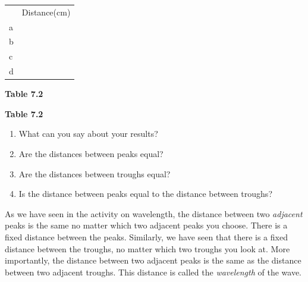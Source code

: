           \begin{table}[H]
        \begin{center}
      \label{m38806*id318530}
    \noindent
      \tablelasttail{}
      \begin{xtabular}[t]{|l|l|}\hline
         &
        Distance(cm)%
     \tabularnewline{}
        a &
     \tabularnewline{}
        b &
     \tabularnewline{}
        c &
     \tabularnewline{}
        d &
     \tabularnewline{}
    \end{xtabular}
      \end{center}
    \begin{center}{\small\bfseries Table 7.2}\end{center}
    \begin{caption}{\small\bfseries Table 7.2}\end{caption}
\end{table}
    \par
        \label{m38806*id318631}\begin{enumerate}[noitemsep, label=\textbf{\arabic*}. ] 
            \label{m38806*uid15}\item What can you say about your results?
\label{m38806*uid16}\item Are the distances between peaks equal?
\label{m38806*uid17}\item Are the distances between troughs equal?
\label{m38806*uid18}\item Is the distance between peaks equal to the distance between troughs?
\end{enumerate}
        \label{m38806*id318690}As we have seen in the activity on wavelength, the distance between two \textsl{adjacent} peaks is the same no matter which two adjacent peaks you choose. There is a fixed distance between the peaks. Similarly, we have seen that there is a fixed distance between the troughs, no matter which two troughs you look at. More importantly, the distance between two adjacent peaks is the same as the distance between two adjacent troughs. This distance is called the \textsl{wavelength} of the wave.\par 
